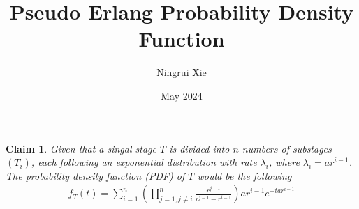 \documentclass[12pt]{article}
\title{\textbf{Pseudo Erlang Probability Density Function}}
\author{Ningrui Xie}
\date{May 2024}
\newtheorem{theorem}{Claim}
\begin{document}
\maketitle


\begin{theorem}
    Given that a singal stage $T$ is divided into $n$ numbers of substages $(T_i)$, each following an exponential distribution with rate $\lambda_i$, where $\lambda_i = ar^{i-1}$. The probability density function (PDF) of $T$ would be the following
    \begin{align}
        f_T(t) = \sum_{i=1}^{n} \left( \prod_{j=1, j \ne i}^{n} \frac{r^{j-1}}{r^{j-1} - r^{i-1}} \right) ar^{i-1} e^{-tar^{i-1}}
    \end{align} 
\end{theorem}

\vspace{10mm}
\end{document}
